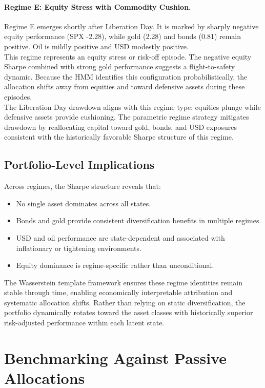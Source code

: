 \documentclass[11pt]{article}
\begin{document}
\paragraph{Regime E: Equity Stress with Commodity Cushion.}

Regime E emerges shortly after Liberation Day. It is marked by sharply negative equity performance (SPX -2.28), while gold (2.28) and bonds (0.81) remain positive. Oil is mildly positive and USD modestly positive.\\
This regime represents an equity stress or risk-off episode. The negative equity Sharpe combined with strong gold performance suggests a flight-to-safety dynamic. Because the HMM identifies this configuration probabilistically, the allocation shifts away from equities and toward defensive assets during these episodes. \\
The Liberation Day drawdown aligns with this regime type: equities plunge while defensive assets provide cushioning. The parametric regime strategy mitigates drawdown by reallocating capital toward gold, bonds, and USD exposures consistent with the historically favorable Sharpe structure of this regime.

\subsection*{Portfolio-Level Implications}

Across regimes, the Sharpe structure reveals that:

\begin{itemize}
    \item No single asset dominates across all states.
    \item Bonds and gold provide consistent diversification benefits in multiple regimes.
    \item USD and oil performance are state-dependent and associated with inflationary or tightening environments.
    \item Equity dominance is regime-specific rather than unconditional.
\end{itemize}
The Wasserstein template framework ensures these regime identities remain stable through time, enabling economically interpretable attribution and systematic allocation shifts. Rather than relying on static diversification, the portfolio dynamically rotates toward the asset classes with historically superior risk-adjusted performance within each latent state.


\section{Benchmarking Against Passive Allocations}
\label{sec:benchmarking}
\end{document}
